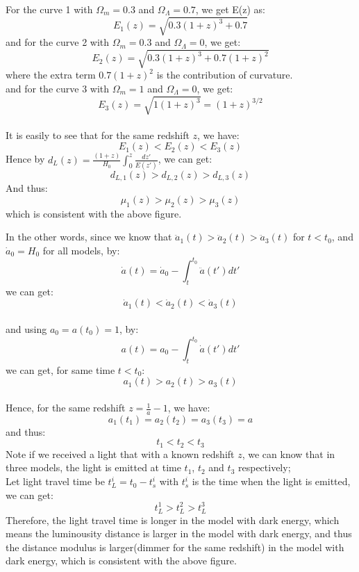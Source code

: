 \bigskip \noindent
\begin{intuition}
    For the curve 1 with $\Omega_m = 0.3$ and $\Omega_\Lambda = 0.7$, we get E(z) as:
    \[
        E_{1}(z) = \sqrt{0.3(1+z)^3 + 0.7}
    \]
    and for the curve 2 with $\Omega_m = 0.3$ and $\Omega_\Lambda = 0$, we get:
    \[
        E_{2}(z) = \sqrt{0.3(1+z)^3 + 0.7(1+z)^2}
    \]
    where the extra term $0.7(1+z)^2$ is the contribution of curvature.\\
    and for the curve 3 with $\Omega_m = 1$ and $\Omega_\Lambda = 0$, we get:
    \[
        E_{3}(z) = \sqrt{1(1+z)^3} = (1+z)^{3/2}
    \] \\

    It is easily to see that for the same redshift $z$, we have:
    \[
        E_{1}(z) < E_{2}(z) < E_{3}(z)
    \]
    Hence by $d_L(z) = \frac{(1+z)}{H_0} \int_0^z \frac{dz'}{E(z')}$, we can get:
    \[
        d_{L,1}(z) > d_{L,2}(z) > d_{L,3}(z)
    \]
    And thus:
    \[
        \mu_1(z) > \mu_2(z) > \mu_3(z)
    \]
    which is consistent with the above figure. \\
\end{intuition}

\bigskip \noindent
\begin{intuition}
    In the other words, since we know that $\ddot{a}_1(t) > \ddot{a}_2(t) > \ddot{a}_3(t)$ for $t < t_0$, and $\dot{a}_0 = H_0$ for all models, by:
    \[
        \dot{a}(t) = \dot{a}_0 - \int_{t}^{t_0} \ddot{a}(t') dt'
    \]
    we can get:
    \[
        \dot{a}_1(t) < \dot{a}_2(t) < \dot{a}_3(t)
    \] \\

    and using $a_0 = a(t_0) = 1$, by:
    \[
        a(t) = a_0 - \int_{t}^{t_0} \dot{a}(t') dt'
    \]
    we can get, for same time $t < t_0$:
    \[
        a_1(t) > a_2(t) > a_3(t)
    \] \\

    Hence, for the same redshift $z = \frac{1}{a} - 1$, we have:
    \[
        a_1(t_1) = a_2(t_2) = a_3(t_3) = a
    \]
    and thus:
    \[
        t_1 < t_2 < t_3
    \]
    Note if we received a light that with a known redshift $z$, we can know that in three models, the light is emitted at time $t_1$, $t_2$ and $t_3$ respectively; \\

    Let light travel time be $t_L^i = t_0 - t_s^i$ with $t_s^i$ is the time when the light is emitted, we can get:
    \[
        t_L^1 > t_L^2 > t_L^3
    \]
    Therefore, the light travel time is longer in the model with dark energy, which means the luminousity distance is larger in the model with dark energy, and thus the distance modulus is larger(dimmer for the same redshift) in the model with dark energy, which is consistent with the above figure. \\
\end{intuition}


